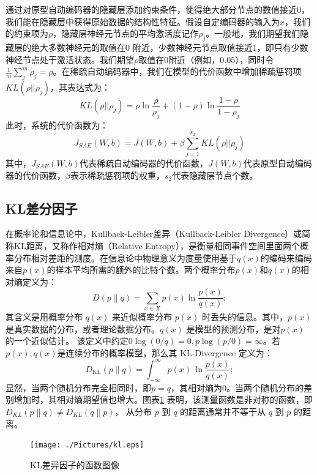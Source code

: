 \documentclass[oneside]{ZJUthesis}
\begin{document}
通过对原型自动编码器的隐藏层添加约束条件，使得绝大部分节点的数值接近0，我们能在隐藏层中获得原始数据的结构性特征\cite{wright2014sparse}。假设自定编码器的输入为$x$，我们的约束项为$\rho$，隐藏层神经元节点的平均激活度记作$\rho_j$。一般地，我们期望我们隐藏层的绝大多数神经元的取值在0 附近，少数神经元节点取值接近1，即只有少数神经节点处于激活状态。我们期望$\rho$取值在0附近（例如，0.05），同时令$\frac{1}{m}\sum_j^m{\rho_j}=\rho$。在稀疏自动编码器中，我们在模型的代价函数中增加稀疏惩罚项$KL(\rho||\rho_j)$，其表达式为：
\begin{equation}
	KL(\rho||\rho_j)=\rho \ln \frac{\rho}{\rho_j} + (1-\rho)\ln \frac{1-\rho}{1-\rho_j}
\end{equation}
此时，系统的代价函数为：
\begin{equation}
	J_{SAE}(W,b)=J(W,b)+\beta \sum_{j=1}^{s_2}KL(\rho||\rho_j)
\end{equation}
其中，$J_{SAE}(W,b)$代表稀疏自动编码器的代价函数，$J(W,b)$代表原型自动编码器的代价函数，$\beta$表示稀疏惩罚项的权重，$s_2$代表隐藏层节点个数\cite{24}。



\subsection{KL差分因子}
在概率论和信息论中，Kullback-Leibler差异（Kullback-Leibler Divergence）或简称KL距离，又称作相对熵（Relative Entropy），是衡量相同事件空间里面两个概率分布相对差距的测度\cite{DBLP:books/daglib/0016248,DBLP:conf/nips/BagnellB08}。在信息论中物理意义为度量使用基于$q(x)$的编码来编码来自$p(x)$的样本平均所需的额外的比特个数。两个概率分布$p(x)$和$q(x)$的相对熵定义为：
\begin{equation}
	D(p\|q)=\sum\limits_{x\in X}{p(x)\ln\frac{p(x)}{q(x)}};
\end{equation}
其含义是用概率分布 $q(x)$ 来近似概率分布 $p(x)$ 时丢失的信息。其中，$p(x)$是真实数据的分布，或者理论数据分布。$q(x)$ 是模型的预测分布，是对$p(x)$ 的一个近似估计。
该定义中约定$0\log (0/q)=0,p\log (p/0)=\infty$。若$p(x),q(x)$是连续分布的概率模型，那么其 KL-Divergence 定义为：
\begin{equation}
	D_{\mathrm{KL}}(p\|q) = \int_{-\infty}^\infty p(x) \, \ln\frac{p(x)}{q(x)};
\end{equation}
显然，当两个随机分布完全相同时，即$p=q$，其相对熵为0。当两个随机分布的差别增加时，其相对熵期望值也增大。图表\ref{fig:kl-divergence} 表明，该测量函数是非对称的函数，即 $D_{KL}(p\|q) \ne D_{KL}(q\|p)$， 从分布 $p$ 到 $q$ 的距离通常并不等于从 $q$ 到 $p$ 的距离。
\begin{figure}[H]
\centering
\texttt{[image: ./Pictures/kl.eps]}
\caption{KL差异因子的函数图像}
\label{fig:kl-divergence}
\end{figure}
\end{document}
